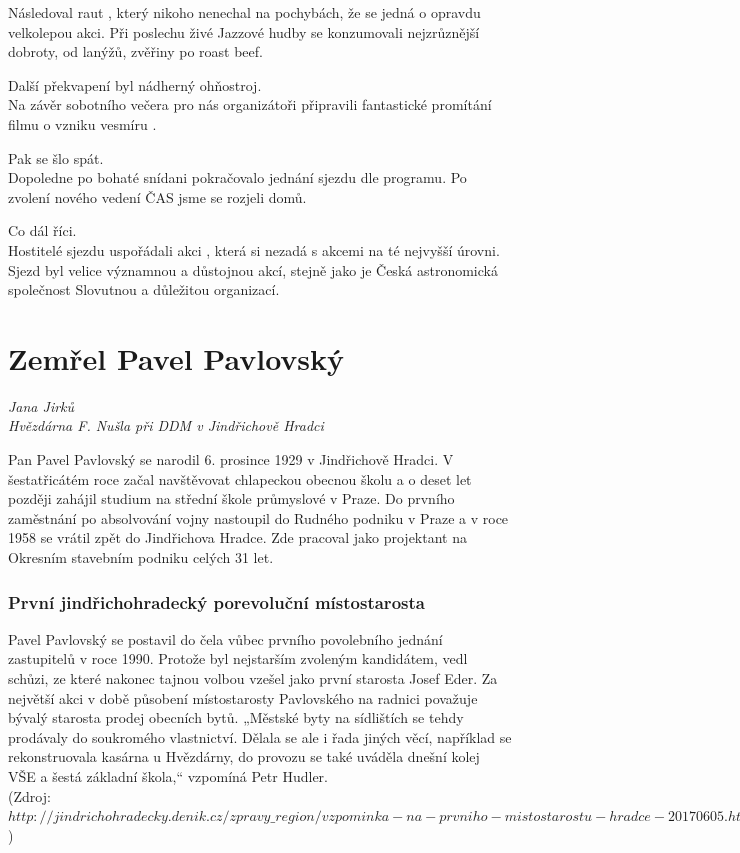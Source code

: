 \documentclass[10pt,a5paper,twoside]{book}
\newcommand{\nadpis}[2]{
\section*{#1}
	\begin{flushright}
	\textit{#2}
	\end{flushright}
}
\begin{document}
Následoval raut , který nikoho nenechal na pochybách, že se jedná o opravdu velkolepou akci. Při poslechu živé Jazzové hudby se konzumovali nejzrůznější dobroty, od lanýžů, zvěřiny  po roast beef. 


Další překvapení byl nádherný ohňostroj. \\ 
Na závěr sobotního večera pro nás organizátoři připravili fantastické promítání filmu o vzniku vesmíru .


Pak se šlo spát.\\
Dopoledne po bohaté snídani pokračovalo jednání sjezdu dle programu. Po zvolení nového vedení ČAS jsme se rozjeli domů.


Co dál říci.\\
Hostitelé sjezdu uspořádali akci , která si nezadá s akcemi na té nejvyšší úrovni. Sjezd byl velice významnou a důstojnou akcí, stejně jako je Česká astronomická společnost Slovutnou a důležitou organizací.





\nadpis{Zemřel Pavel Pavlovský
}{Jana Jirků \\ Hvězdárna F. Nušla při DDM v Jindřichově Hradci}

Pan Pavel Pavlovský se narodil 6. prosince 1929 v Jindřichově Hradci. V šestatřicátém roce začal navštěvovat chlapeckou obecnou školu a o deset let později zahájil studium na střední škole průmyslové v Praze. Do prvního zaměstnání po absolvování vojny nastoupil do Rudného podniku v Praze a v roce 1958 se vrátil zpět do Jindřichova Hradce. Zde pracoval jako projektant na Okresním stavebním podniku celých 31 let.


\subsubsection*{První jindřichohradecký porevoluční místostarosta}
Pavel Pavlovský se postavil do čela vůbec prvního povolebního jednání zastupitelů v roce 1990. Protože byl nejstarším zvoleným kandidátem, vedl schůzi, ze které nakonec tajnou volbou vzešel jako první starosta Josef Eder. Za největší akci v době působení místostarosty Pavlovského na radnici považuje bývalý starosta prodej obecních bytů. „Městské byty na sídlištích se tehdy prodávaly do soukromého vlastnictví. Dělala se ale i řada jiných věcí, například se rekonstruovala kasárna u Hvězdárny, do provozu se také uváděla dnešní kolej VŠE a šestá základní škola,“ vzpomíná Petr Hudler.\\
(Zdroj: $http://jindrichohradecky.denik.cz/zpravy\_region/vzpominka-na- prvniho-mistostarostu-hradce-20170605.html$)
\end{document}
